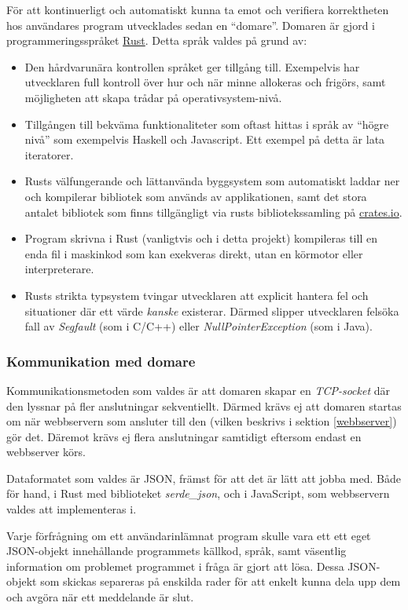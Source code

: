 \documentclass{article}
\begin{document}
För att kontinuerligt och automatiskt kunna ta emot och verifiera korrektheten
hos användares program utvecklades sedan en ``domare''. Domaren är gjord i
programmeringsspråket \href{https://rust-lang.org}{Rust}. Detta språk valdes på
grund av:

\begin{itemize}
	\item Den hårdvarunära kontrollen språket ger tillgång till. Exempelvis har
		utvecklaren full kontroll över hur och när minne allokeras och frigörs,
		samt möjligheten att skapa trådar på operativsystem-nivå.
	\item Tillgången till bekväma funktionaliteter som oftast hittas i språk av
		``högre nivå'' som exempelvis Haskell och Javascript. Ett exempel på
		detta är lata iteratorer.
	\item Rusts välfungerande och lättanvända byggsystem som automatiskt
		laddar ner och kompilerar bibliotek som används av applikationen, samt
		det stora antalet bibliotek som finns tillgängligt via rusts
		bibliotekssamling på \href{https://crates.io}{crates.io}.
	\item Program skrivna i Rust (vanligtvis och i detta projekt) kompileras
		till en enda fil i maskinkod som kan exekveras direkt, utan en körmotor
		eller interpreterare.
	\item Rusts strikta typsystem tvingar utvecklaren att explicit hantera fel
		och situationer där ett värde \textit{kanske} existerar. Därmed slipper
		utvecklaren felsöka fall av \textit{Segfault} (som i C/C++) eller
		\textit{NullPointerException} (som i Java).
\end{itemize}

\subsubsection{Kommunikation med domare}

Kommunikationsmetoden som valdes är att domaren skapar en \textit{TCP-socket}
där den lyssnar på fler anslutningar sekventiellt. Därmed krävs ej att domaren
startas om när webbservern som ansluter till den (vilken beskrivs i sektion
\ref{webbserver}) gör det. Däremot krävs ej flera anslutningar samtidigt
eftersom endast en webbserver körs.

Dataformatet som valdes är JSON, främst för att det är lätt att jobba med. Både
för hand, i Rust med biblioteket \textit{serde\_json}, och i JavaScript, som
webbservern valdes att implementeras i.

Varje förfrågning om ett användarinlämnat program skulle vara ett ett eget
JSON-objekt innehållande programmets källkod, språk, samt väsentlig information
om problemet programmet i fråga är gjort att lösa. Dessa JSON-objekt som skickas
separeras på enskilda rader för att enkelt kunna dela upp dem och avgöra när ett
meddelande är slut.
\end{document}

